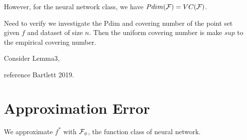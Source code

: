 
However, for the neural network class, we have $Pdim(\mathcal{F}) = VC(\mathcal{F})$.

Need to verify we investigate the Pdim and covering number of the point set given $f$ and dataset of size $n$.
Then the uniform covering number is make $sup$ to the empirical covering number.

Consider Lemma3,

reference Bartlett 2019.


\section{Approximation Error}

We approximate $f^*$ with $\mathcal{F}_\phi$, the function class of neural network.





